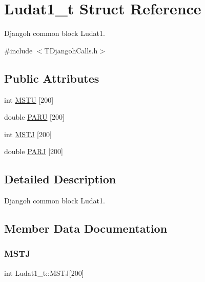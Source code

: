 \hypertarget{struct_ludat1__t}{}\section{Ludat1\+\_\+t Struct Reference}
\label{struct_ludat1__t}


Djangoh common block Ludat1.  




{\ttfamily \#include $<$T\+Djangoh\+Calls.\+h$>$}

\subsection*{Public Attributes}
\begin{DoxyCompactItemize}
\item 
int \hyperlink{struct_ludat1__t_ae01a3aee4bb22a760e8ea252207e2cd4}{M\+S\+TU} \mbox{[}200\mbox{]}
\item 
double \hyperlink{struct_ludat1__t_acde27cfd0ebacc6b76cdcb339044c627}{P\+A\+RU} \mbox{[}200\mbox{]}
\item 
int \hyperlink{struct_ludat1__t_ab47d0cbcea897c1d7f6993c63d8fb1d8}{M\+S\+TJ} \mbox{[}200\mbox{]}
\item 
double \hyperlink{struct_ludat1__t_a3c1647b2c9d49467b84324857e22daaf}{P\+A\+RJ} \mbox{[}200\mbox{]}
\end{DoxyCompactItemize}


\subsection{Detailed Description}
Djangoh common block Ludat1. 

\subsection{Member Data Documentation}
\mbox{\label{struct_ludat1__t_ab47d0cbcea897c1d7f6993c63d8fb1d8}} 
\subsubsection{\texorpdfstring{M\+S\+TJ}{MSTJ}}
{\footnotesize\ttfamily int Ludat1\+\_\+t\+::\+M\+S\+TJ\mbox{[}200\mbox{]}}

\mbox{\label{struct_ludat1__t_ae01a3aee4bb22a760e8ea252207e2cd4}} 
